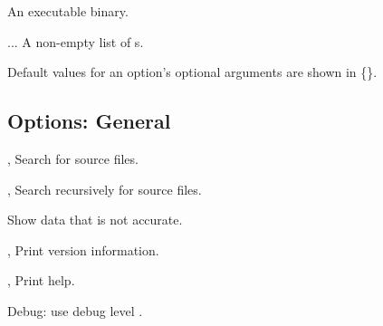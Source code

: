 \documentclass[english]{article}
\begin{document}
\begin{Description}
\item[\Arg{executable}] An executable binary.
\item[\Arg{hpcrun-file}...] A non-empty list of s.
\end{Description}

Default values for an option's optional arguments are shown in \{\}.

\subsection{Options: General}

\begin{Description}
\item[\OptArg{-d}{dir}, \OptArg{--directory}{dir}] Search  for source files.
\item[\OptArg{-D}{dir}, \OptArg{--recursive-directory}{dir}] Search  recursively for source files.
\item[\Opt{--force}] Show data that is not accurate.
\item[\Opt{-V}, \Opt{--version}] Print version information.
\item[\Opt{-h}, \Opt{--help}] Print help.
\item[\OptArg{--debug}{n}]   Debug: use debug level .
\end{Description}
\end{document}
